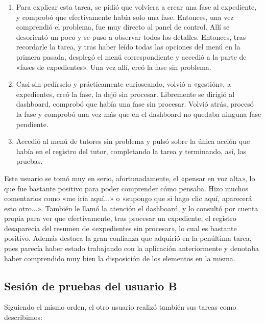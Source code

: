 \begin{enumerate}
	\item Para explicar esta tarea, se pidió que volviera a crear una fase al expediente, y comprobó que efectivamente había solo una fase. Entonces, una vez comprendió el problema, fue muy directo al panel de control. Allí se desorientó un poco y se puso a observar todos los detalles. Entonces, tras recordarle la tarea, y tras haber leído todas las opciones del menú en la primera pasada, desplegó el menú correspondiente y accedió a la parte de «fases de expedientes». Una vez allí, creó la fase sin problema.
	\item Casi sin pedírselo y prácticamente curioseando, volvió a «gestión», a expedientes, creó la fase, la dejó sin procesar. Libremente se dirigió al dashboard, comprobó que había una fase sin procesar. Volvió atrás, procesó la fase y comprobó una vez más que en el dashboard no quedaba ninguna fase pendiente.
	\item Accedió al menú de tutores sin problema y pulsó sobre la única acción que había en el registro del tutor, completando la tarea y terminando, así, las pruebas.
\end{enumerate}

Este usuario se tomó muy en serio, afortunadamente, el «pensar en voz alta», lo que fue bastante positivo para poder comprender cómo pensaba. Hizo muchos comentarios como «me iría aquí...» o «supongo que si hago clic aquí, aparecerá esto otro...». También le llamó la atención el dashboard, y lo consultó por cuenta propia para ver que efectivamente, tras procesar un expediente, el registro desaparecía del resumen de «expedientes sin procesar», lo cual es bastante positivo. Además destaca la gran confianza que adquirió en la penúltima tarea, pues parecía haber estado trabajando con la aplicación anteriormente y denotaba haber comprendido muy bien la disposición de los elementos en la misma.

\subsection{Sesión de pruebas del usuario B}


Siguiendo el mismo orden, el otro usuario realizó también sus tareas como describimos:

